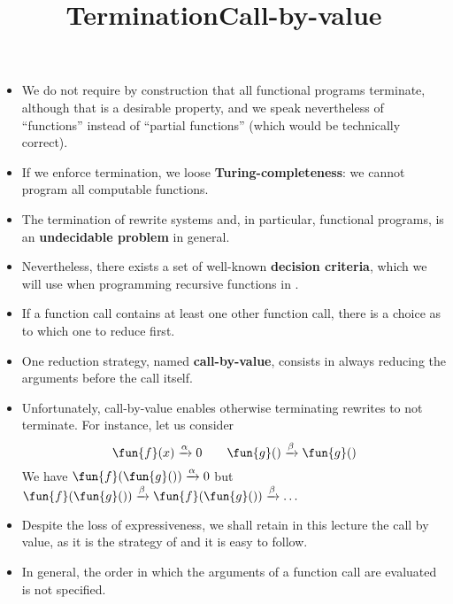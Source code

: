 \documentclass[wide]{slides}
\begin{document}
\begin{slide}
  \title{Termination}

  \begin{itemize}

    \item We do not require by construction that all functional
      programs terminate, although that is a desirable property, and
      we speak nevertheless of ``functions'' instead of ``partial
      functions'' (which would be technically correct).

    \item If we enforce termination, we loose
      \textbf{Turing\hyp{}completeness}: we cannot program all
      computable functions.

    \item The termination of rewrite systems and, in particular,
      functional programs, is an \textbf{undecidable problem} in
      general.

    \item Nevertheless, there exists a set of well\hyp{}known
      \textbf{decision criteria}, which we will use when programming
      recursive functions in \OCaml.

  \end{itemize}

\end{slide}

\begin{slide}
  \title{Call-by-value}

  \begin{itemize}

    \item If a function call contains at least one other function
      call, there is a choice as to which one to reduce first.

    \item One reduction strategy, named \textbf{call-by-value},
      consists in always reducing the arguments before the call
      itself.

    \item Unfortunately, call-by-value enables otherwise terminating
      rewrites to not terminate. For instance, let us consider
      \begin{equation*}
        \fun{f}(x) \xrightarrow{\alpha} 0\qquad
        \fun{g}() \xrightarrow{\beta} \fun{g}()
      \end{equation*}
      We have \(\fun{f}(\fun{g}()) \xrightarrow{\alpha} 0\)
      but \(\fun{f}(\fun{g}()) \xrightarrow{\beta}
      \fun{f}(\fun{g}()) \xrightarrow{\beta} \dots\)

    \item Despite the loss of expressiveness, we shall retain in this
      lecture the call by value, as it is the strategy of \OCaml and
      it is easy to follow.

    \item In general, the order in which the arguments of a function
      call are evaluated is not specified.

  \end{itemize}

\end{slide}
\end{document}
